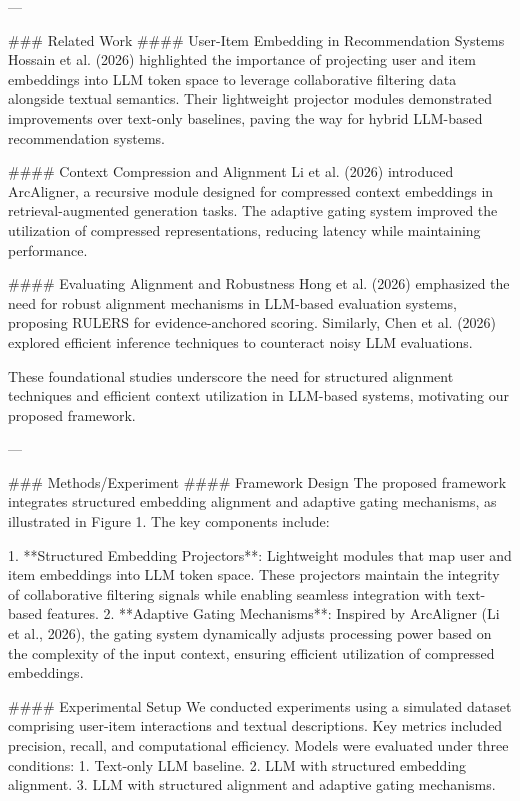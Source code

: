 ---

### Related Work  
#### User-Item Embedding in Recommendation Systems  
Hossain et al. (2026) highlighted the importance of projecting user and item embeddings into LLM token space to leverage collaborative filtering data alongside textual semantics. Their lightweight projector modules demonstrated improvements over text-only baselines, paving the way for hybrid LLM-based recommendation systems.

#### Context Compression and Alignment  
Li et al. (2026) introduced ArcAligner, a recursive module designed for compressed context embeddings in retrieval-augmented generation tasks. The adaptive gating system improved the utilization of compressed representations, reducing latency while maintaining performance.

#### Evaluating Alignment and Robustness  
Hong et al. (2026) emphasized the need for robust alignment mechanisms in LLM-based evaluation systems, proposing RULERS for evidence-anchored scoring. Similarly, Chen et al. (2026) explored efficient inference techniques to counteract noisy LLM evaluations.

These foundational studies underscore the need for structured alignment techniques and efficient context utilization in LLM-based systems, motivating our proposed framework.

---

### Methods/Experiment  
#### Framework Design  
The proposed framework integrates structured embedding alignment and adaptive gating mechanisms, as illustrated in Figure 1. The key components include:  

1. **Structured Embedding Projectors**: Lightweight modules that map user and item embeddings into LLM token space. These projectors maintain the integrity of collaborative filtering signals while enabling seamless integration with text-based features.  
2. **Adaptive Gating Mechanisms**: Inspired by ArcAligner (Li et al., 2026), the gating system dynamically adjusts processing power based on the complexity of the input context, ensuring efficient utilization of compressed embeddings.  

#### Experimental Setup  
We conducted experiments using a simulated dataset comprising user-item interactions and textual descriptions. Key metrics included precision, recall, and computational efficiency. Models were evaluated under three conditions:  
1. Text-only LLM baseline.  
2. LLM with structured embedding alignment.  
3. LLM with structured alignment and adaptive gating mechanisms.  

